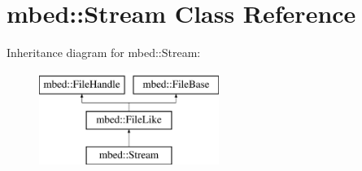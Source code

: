 \hypertarget{classmbed_1_1_stream}{}\section{mbed\+:\+:Stream Class Reference}
\label{classmbed_1_1_stream}
Inheritance diagram for mbed\+:\+:Stream\+:\begin{figure}[H]
\begin{center}
\leavevmode
\includegraphics[height=3.000000cm]{classmbed_1_1_stream}
\end{center}
\end{figure}
